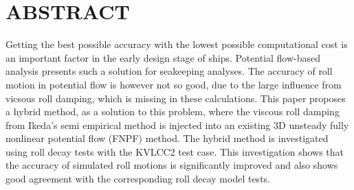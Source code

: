 \section*{ABSTRACT}\label{abstract}
Getting the best possible accuracy with the lowest possible
computational cost is an important factor in the early design stage of
ships. Potential flow-based analysis presents such a solution for
seakeeping analyses. The accuracy of roll motion in potential flow is
however not so good, due to the large influence from vicsous roll
damping, which is missing in these calculations. This paper proposes a
hybrid method, as a solution to this problem, where the viscous roll
damping from Ikeda's semi empirical method is injected into an existing
3D unsteady fully nonlinear potential flow (FNPF) method. The hybrid
method is investigated using roll decay tests with the KVLCC2 test case.
This investigation shows that the accuracy of simulated roll motions is
significantly improved and also shows good agreement with the
corresponding roll decay model tests.
